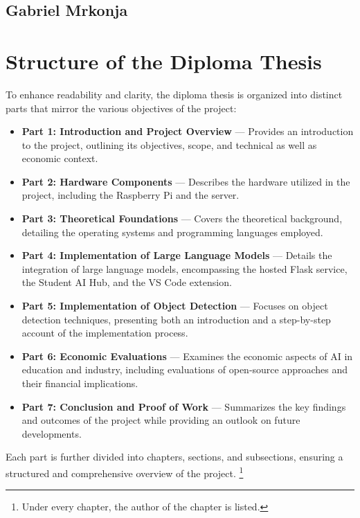 \subsection{Gabriel Mrkonja}


\section{Structure of the Diploma Thesis}

To enhance readability and clarity, the diploma thesis is organized into distinct parts that mirror the various objectives of the project:

\begin{itemize}
    \item \textbf{Part 1: Introduction and Project Overview} — Provides an introduction to the project, outlining its objectives, scope, and technical as well as economic context.
    \item \textbf{Part 2: Hardware Components} — Describes the hardware utilized in the project, including the Raspberry Pi and the server.
    \item \textbf{Part 3: Theoretical Foundations} — Covers the theoretical background, detailing the operating systems and programming languages employed.
    \item \textbf{Part 4: Implementation of Large Language Models} — Details the integration of large language models, encompassing the hosted Flask service, the Student AI Hub, and the VS Code extension.
    \item \textbf{Part 5: Implementation of Object Detection} — Focuses on object detection techniques, presenting both an introduction and a step-by-step account of the implementation process.
    \item \textbf{Part 6: Economic Evaluations} — Examines the economic aspects of AI in education and industry, including evaluations of open-source approaches and their financial implications.
    \item \textbf{Part 7: Conclusion and Proof of Work} — Summarizes the key findings and outcomes of the project while providing an outlook on future developments.
\end{itemize}

Each part is further divided into chapters, sections, and subsections, ensuring a structured and comprehensive overview of the project.
\footnote{Under every chapter, the author of the chapter is listed.}

